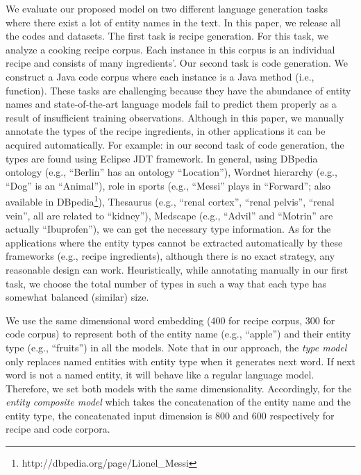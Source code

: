 \documentclass[11pt,a4paper]{article}
\begin{document}
We evaluate our proposed model on two different language generation tasks where there exist a lot of entity names in the text. In this paper, we release all the codes and datasets.
The first task is recipe generation. For this task, we analyze a cooking recipe corpus. Each instance in this corpus is an individual recipe and 
consists of 
many ingredients'.
Our second task is code generation. We construct a Java code corpus where each instance is a Java method (i.e., function). 
These tasks are challenging because they have the abundance of entity names and state-of-the-art language models fail to predict them properly as a result of insufficient training observations.  Although in this paper, we manually annotate the types of the recipe ingredients, in other applications it can be acquired automatically.  For example: in our second task of code generation, the types are found using Eclipse JDT framework. In general, using DBpedia ontology (e.g., ``Berlin'' has an ontology ``Location''), Wordnet hierarchy (e.g., ``Dog'' is an ``Animal''), role in sports (e.g., ``Messi'' plays in ``Forward''; also available in DBpedia\footnote{ http://dbpedia.org/page/Lionel\_Messi}), Thesaurus (e.g., ``renal cortex'', ``renal pelvis'', ``renal vein'', all are related to ``kidney''), Medscape (e.g., ``Advil'' and ``Motrin'' are actually ``Ibuprofen''), we can get the necessary type information. As for the applications where the entity types cannot be extracted automatically by these frameworks (e.g., recipe ingredients), although there is no exact strategy, any reasonable design can work. Heuristically, while annotating manually in our first task, we choose the total number of types in such a way that each type has somewhat balanced (similar) size. 

We use the same dimensional word embedding (400 for recipe corpus, 300 for code corpus) to represent both of the entity name (e.g., ``apple'') and their entity type (e.g., ``fruits'') in all the models. Note that in our approach, the \textit{type model} only replaces named entities with entity type when it generates next word. If next word is not a named entity, it will behave like a regular language model. Therefore, we set both models with the same dimensionality. Accordingly, for the \textit{entity composite model} which takes the concatenation of the entity name and the entity type, the concatenated input dimension is 800 and 600 respectively for recipe and code corpora. 
\end{document}

